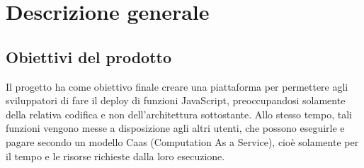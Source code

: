 \section{Descrizione generale}

\subsection{Obiettivi del prodotto}
Il progetto \NomeProgetto{} ha come obiettivo finale creare una piattaforma per permettere agli sviluppatori di fare il deploy di funzioni JavaScript, preoccupandosi solamente della relativa codifica e non dell'architettura sottostante. Allo stesso tempo, tali funzioni vengono messe a disposizione agli altri utenti, che possono eseguirle e pagare secondo un modello Caas (Computation As a Service), cioè solamente per il tempo e le risorse richieste dalla loro esecuzione.

